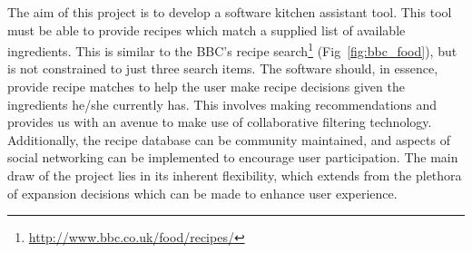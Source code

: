 The aim of this project is to develop a software kitchen assistant tool. This tool must be able to provide recipes which match a supplied list of available ingredients. This is similar to the BBC's recipe search\footnote{\url{http://www.bbc.co.uk/food/recipes/}} (Fig~\ref{fig:bbc_food}), but is not constrained to just three search items. The software should, in essence, provide recipe matches to help the user make recipe decisions given the ingredients he/she currently has. This involves making recommendations and provides us with an avenue to make use of collaborative filtering technology. Additionally, the recipe database can be community maintained, and aspects of social networking can be implemented to encourage user participation. The main draw of the project lies in its inherent flexibility, which extends from the plethora of expansion decisions which can be made to enhance user experience.
